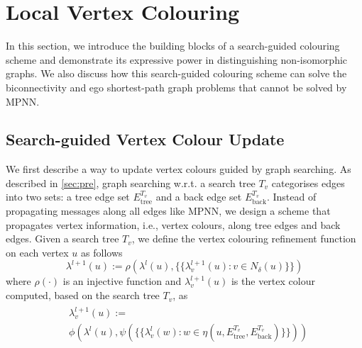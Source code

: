 \section{Local Vertex Colouring}

In this section, we introduce the building blocks of a search-guided colouring scheme and demonstrate its expressive power in distinguishing non-isomorphic graphs. We also discuss how this search-guided colouring scheme can solve the biconnectivity and ego shortest-path graph problems that cannot be solved by MPNN. 

\subsection{Search-guided Vertex Colour Update}
We first describe a way to update vertex colours guided by graph searching. As described in \cref{sec:pre}, graph searching w.r.t. a search tree $T_v$ categorises edges into two sets: a tree edge set $E_{\text{tree}}^{T_v}$ and a back edge set $E_{\text{back}}^{T_v}$. 
Instead of propagating messages along all edges like MPNN, we design a scheme that propagates vertex information, i.e., vertex colours, along tree edges and back edges.  Given a search tree $T_v$, we define the vertex colouring refinement function on each vertex $u$ as follows
\begin{equation}
\label{eqn:lvc-all}
    \lambda^{l+1}(u):= \rho(\lambda^{l}(u), \{\!\!\{\lambda_v^{l+1}(u): v\in N_{\delta}(u)\}\!\!\})
\end{equation}
where $\rho(\cdot)$ is an injective function and $\lambda_v^{l+1}(u)$ is the vertex colour computed, based on the search tree $T_v$, as  
\begin{align}
\label{eqn:lvc}
\begin{split}
    &\lambda_v^{l+1}(u):=\\
    &\phi\left(\lambda^{l}(u), \psi\left(\{\!\!\{\lambda_v^{l}(w): w \in \eta(u, E_{\text{tree}}^{T_v}, E_{\text{back}}^{T_v})\}\!\!\}\right)\right)
\end{split}
\end{align}

